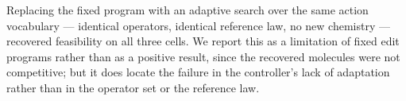 Replacing the fixed program with an adaptive search over the same action
vocabulary --- identical operators, identical reference law, no new chemistry
--- recovered feasibility on all three cells. We report this as a limitation of
fixed edit programs rather than as a positive result, since the recovered
molecules were not competitive; but it does locate the failure in the
controller's lack of adaptation rather than in the operator set or the
reference law.

